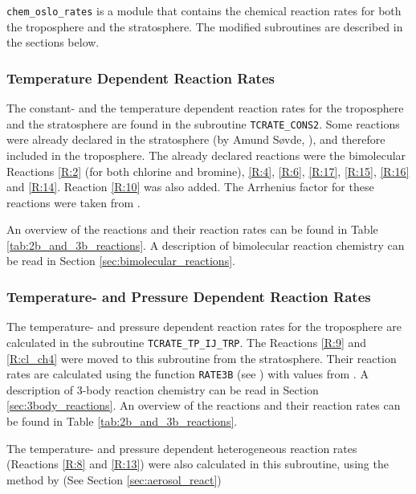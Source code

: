 \texttt{chem\_oslo\_rates} is a module that contains the chemical reaction rates for both the troposphere and the stratosphere. The modified subroutines are described in the sections below.


\subsubsection{Temperature Dependent Reaction Rates}\label{sec:temp_depend_react_rates}

The constant- and the temperature dependent reaction rates for the troposphere and the stratosphere are found in the subroutine \texttt{TCRATE\_CONS2}. Some reactions were already declared in the stratosphere (by Amund Søvde, \cite{SovdeManual}), and therefore included in the troposphere. The already declared reactions were the bimolecular Reactions \ref{R:2} (for both chlorine and bromine),  \ref{R:4}, \ref{R:6}, \ref{R:17}, \ref{R:15}, \ref{R:16} and \ref{R:14}. Reaction \ref{R:10} was also added. The Arrhenius factor for these reactions were taken from \cite{JPL}. 

\medskip

An overview of the reactions and their reaction rates can be found in Table \ref{tab:2b_and_3b_reactions}. A description of bimolecular reaction chemistry can be read in Section \ref{sec:bimolecular_reactions}. 

\subsubsection{Temperature- and Pressure Dependent Reaction Rates}\label{sec:temp_press_dependent_react_rates}

The temperature- and pressure dependent reaction rates for the troposphere are calculated in the subroutine \texttt{TCRATE\_TP\_IJ\_TRP}. The Reactions \ref{R:9} and \ref{R:cl_ch4} were moved to this subroutine from the stratosphere. Their reaction rates are calculated using the function \texttt{RATE3B} (see \cite{SovdeManual}) with values from \cite{JPL}. A description of 3-body reaction chemistry can be read in Section \ref{sec:3body_reactions}. An overview of the reactions and their reaction rates can be found in Table \ref{tab:2b_and_3b_reactions}. 

\medskip

The temperature- and pressure dependent heterogeneous reaction rates (Reactions \ref{R:8} and \ref{R:13}) were also calculated in this subroutine, using the method by \cite{CAO} (See Section \ref{sec:aerosol_react})

